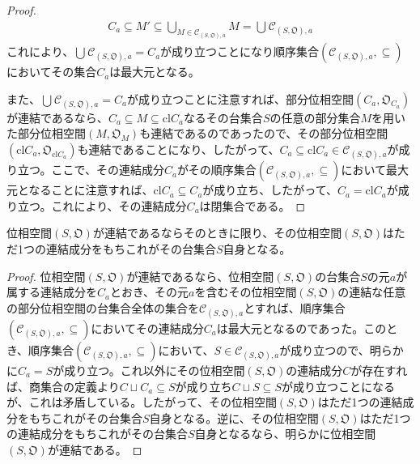 \documentclass[dvipdfmx]{jsarticle}
\begin{document}
\begin{proof}
\begin{align*}
C_{a} \subseteq M' \subseteq \bigcup_{M \in \mathcal{C}_{\left( S,\mathfrak{O} \right),a}} M = \bigcup_{} \mathcal{C}_{\left( S,\mathfrak{O} \right),a}
\end{align*}
これにより、$\bigcup_{} \mathcal{C}_{\left( S,\mathfrak{O} \right),a} = C_{a}$が成り立つことになり順序集合$\left( \mathcal{C}_{\left( S,\mathfrak{O} \right),a}, \subseteq \right)$においてその集合$C_{a}$は最大元となる。\par
また、$\bigcup_{} \mathcal{C}_{\left( S,\mathfrak{O} \right),a} = C_{a}$が成り立つことに注意すれば、部分位相空間$\left( C_{a},\mathfrak{O}_{C_{a}} \right)$が連結であるなら、$C_{a} \subseteq M \subseteq {\mathrm{cl}}C_{a}$なるその台集合$S$の任意の部分集合$M$を用いた部分位相空間$\left( M,\mathfrak{O}_{M} \right)$も連結であるのであったので、その部分位相空間$\left( {\mathrm{cl}}C_{a},\mathfrak{O}_{{\mathrm{cl}}C_{a}} \right)$も連結であることになり、したがって、$C_{a} \subseteq {\mathrm{cl}}C_{a} \in \mathcal{C}_{\left( S,\mathfrak{O} \right),a}$が成り立つ。ここで、その連結成分$C_{a}$がその順序集合$\left( \mathcal{C}_{\left( S,\mathfrak{O} \right),a}, \subseteq \right)$において最大元となることに注意すれば、${\mathrm{cl}}C_{a} \subseteq C_{a}$が成り立ち、したがって、$C_{a} = {\mathrm{cl}}C_{a}$が成り立つ。これにより、その連結成分$C_{a}$は閉集合である。
\end{proof}
\begin{thm}\label{8.1.5.10}
位相空間$\left( S,\mathfrak{O} \right)$が連結であるならそのときに限り、その位相空間$\left( S,\mathfrak{O} \right)$はただ1つの連結成分をもちこれがその台集合$S$自身となる。
\end{thm}
\begin{proof}
位相空間$\left( S,\mathfrak{O} \right)$が連結であるなら、位相空間$\left( S,\mathfrak{O} \right)$の台集合$S$の元$a$が属する連結成分を$C_{a}$とおき、その元$a$を含むその位相空間$\left( S,\mathfrak{O} \right)$の連結な任意の部分位相空間の台集合全体の集合を$\mathcal{C}_{\left( S,\mathfrak{O} \right),a}$とすれば、順序集合$\left( \mathcal{C}_{\left( S,\mathfrak{O} \right),a}, \subseteq \right)$においてその連結成分$C_{a}$は最大元となるのであった。このとき、順序集合$\left( \mathcal{C}_{\left( S,\mathfrak{O} \right),a}, \subseteq \right)$において、$S \in \mathcal{C}_{\left( S,\mathfrak{O} \right),a}$が成り立つので、明らかに$C_{a} = S$が成り立つ。これ以外にその位相空間$\left( S,\mathfrak{O} \right)$の連結成分$C$が存在すれば、商集合の定義より$C \sqcup C_{a} \subseteq S$が成り立ち$C \sqcup S \subseteq S$が成り立つことになるが、これは矛盾している。したがって、その位相空間$\left( S,\mathfrak{O} \right)$はただ1つの連結成分をもちこれがその台集合$S$自身となる。逆に、その位相空間$\left( S,\mathfrak{O} \right)$はただ1つの連結成分をもちこれがその台集合$S$自身となるなら、明らかに位相空間$\left( S,\mathfrak{O} \right)$が連結である。
\end{proof}
\end{document}
